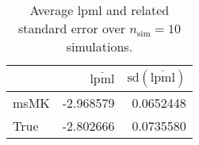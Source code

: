\begin{table}[H]

\caption{Average lpml and related standard error over $n_{\text{sim}} = 10$ simulations.}
\centering
\begin{tabular}[t]{lrr}
\toprule
  & $\overbar{\text{lpml}}$ & $\text{sd}(\overbar{\text{lpml}})$\\
\midrule
msMK & -2.968579 & 0.0652448\\
True & -2.802666 & 0.0735580\\
\bottomrule
\end{tabular}
\end{table}